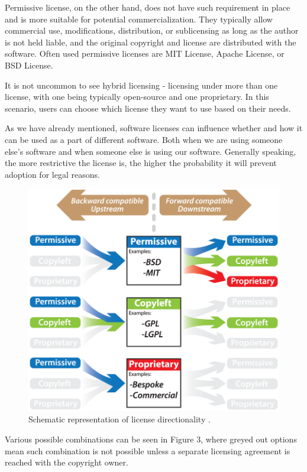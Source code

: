 \documentclass[a4paper,twocolumn]{article}
\begin{document}
Permissive license, on the other hand, does not have such requirement in place and is more suitable for potential commercialization.
They typically allow commercial use, modifications, distribution, or sublicensing as long as the author is not held liable, and the original copyright and license are distributed with the software.
Often used permissive licenses are MIT License, Apache License, or BSD License.

It is not uncommon to see hybrid licensing - licensing under more than one license, with one being typically open-source and one proprietary.
In this scenario, users can choose which license they want to use based on their needs.

As we have already mentioned, software licenses can influence whether and how it can be used as a part of different software.
Both when we are using someone else's software and when someone else is using our software.
Generally speaking, the more restrictive the license is, the higher the probability it will prevent adoption for legal reasons.

\begin{figure}[ht]
    \includegraphics[width=\linewidth]{../paper/figures/license-compatibility}
    \caption{Schematic representation of license directionality \cite{7}.}
    \centering
\end{figure}

Various possible combinations can be seen in Figure 3, where greyed out options mean such combination is not possible unless a separate licensing agreement is reached with the copyright owner.
\end{document}
